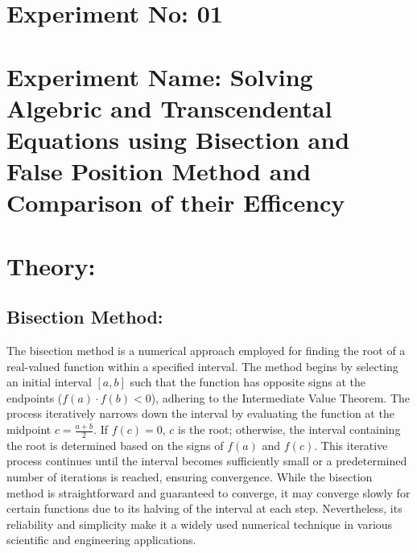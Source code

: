 \documentclass[a4paper,12pt]{report}
\begin{document}
\section*{Experiment No: 01}
\section*{Experiment Name: \small Solving Algebric and Transcendental Equations using Bisection and False Position Method and Comparison of their Efficency}
\section*{Theory:}

\subsection*{Bisection Method:}
\qquad The bisection method is a numerical approach employed for finding the root of a real-valued function within a specified interval. The method begins by selecting an initial interval $[a, b]$ such that the function has opposite signs at the endpoints ($f(a) \cdot f(b) < 0$), adhering to the Intermediate Value Theorem. The process iteratively narrows down the interval by evaluating the function at the midpoint $c = \frac{a+b}{2}$. If $f(c) = 0$, $c$ is the root; otherwise, the interval containing the root is determined based on the signs of $f(a)$ and $f(c)$. This iterative process continues until the interval becomes sufficiently small or a predetermined number of iterations is reached, ensuring convergence. While the bisection method is straightforward and guaranteed to converge, it may converge slowly for certain functions due to its halving of the interval at each step. Nevertheless, its reliability and simplicity make it a widely used numerical technique in various scientific and engineering applications.
\end{document}
